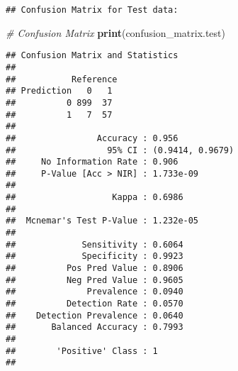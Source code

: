 \documentclass[
]{article}
\newenvironment{Shaded}{\begin{snugshade}}{\end{snugshade}}
\newcommand{\AttributeTok}[1]{\textcolor[rgb]{0.13,0.29,0.53}{#1}}
\newcommand{\CommentTok}[1]{\textcolor[rgb]{0.56,0.35,0.01}{\textit{#1}}}
\newcommand{\FunctionTok}[1]{\textcolor[rgb]{0.13,0.29,0.53}{\textbf{#1}}}
\newcommand{\NormalTok}[1]{#1}
\newcommand{\OtherTok}[1]{\textcolor[rgb]{0.56,0.35,0.01}{#1}}
\newcommand{\SpecialCharTok}[1]{\textcolor[rgb]{0.81,0.36,0.00}{\textbf{#1}}}
\newcommand{\StringTok}[1]{\textcolor[rgb]{0.31,0.60,0.02}{#1}}
\begin{document}
\begin{Shaded}
\end{Shaded}

\begin{verbatim}
## Confusion Matrix for Test data:
\end{verbatim}

\begin{Shaded}
\begin{Highlighting}[]
\CommentTok{\# Confusion Matrix }
\FunctionTok{print}\NormalTok{(confusion\_matrix.test)}
\end{Highlighting}
\end{Shaded}

\begin{verbatim}
## Confusion Matrix and Statistics
## 
##           Reference
## Prediction   0   1
##          0 899  37
##          1   7  57
##                                           
##                Accuracy : 0.956           
##                  95% CI : (0.9414, 0.9679)
##     No Information Rate : 0.906           
##     P-Value [Acc > NIR] : 1.733e-09       
##                                           
##                   Kappa : 0.6986          
##                                           
##  Mcnemar's Test P-Value : 1.232e-05       
##                                           
##             Sensitivity : 0.6064          
##             Specificity : 0.9923          
##          Pos Pred Value : 0.8906          
##          Neg Pred Value : 0.9605          
##              Prevalence : 0.0940          
##          Detection Rate : 0.0570          
##    Detection Prevalence : 0.0640          
##       Balanced Accuracy : 0.7993          
##                                           
##        'Positive' Class : 1               
## 
\end{verbatim}
\end{document}

